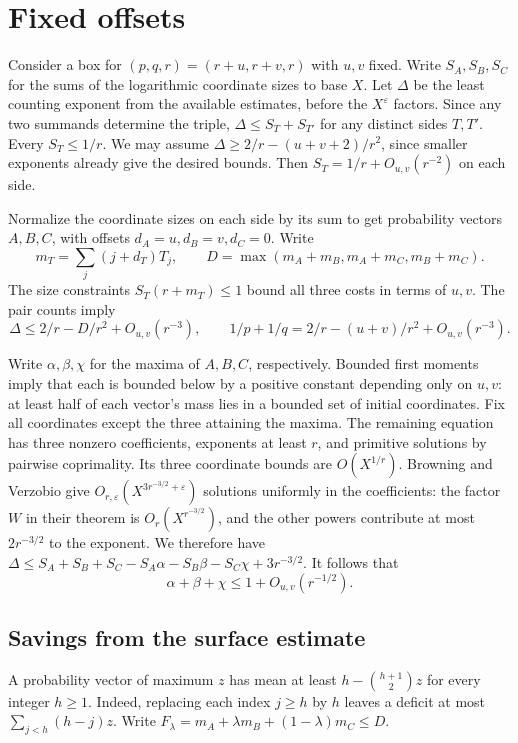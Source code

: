 \documentclass[11pt,reqno]{amsart}
\newcommand{\eps}{\varepsilon}
\begin{document}
\section{Fixed offsets}
Consider a box for \((p,q,r)=(r+u,r+v,r)\) with \(u,v\) fixed.
Write \(S_A,S_B,S_C\) for the sums of the logarithmic coordinate
sizes to base \(X\). Let \(\Delta\) be the least counting exponent
from the available estimates, before the \(X^\eps\) factors.
Since any two summands determine the triple, \(\Delta\le S_T+S_{T'}\)
for any distinct sides \(T,T'\). Every \(S_T\le1/r\).
We may assume \(\Delta\ge2/r-(u+v+2)/r^2\), since smaller
exponents already give the desired bounds. Then
\(S_T=1/r+O_{u,v}(r^{-2})\) on each side.

Normalize the coordinate sizes on each side by its sum to get
probability vectors \(A,B,C\), with offsets \(d_A=u,d_B=v,d_C=0\).
Write
\[
 m_T=\sum_j(j+d_T)T_j,\qquad D=\max(m_A+m_B,m_A+m_C,m_B+m_C).
\]
The size constraints \(S_T(r+m_T)\le1\) bound all three costs
in terms of \(u,v\). The pair counts imply
\begin{equation}\label{eq:consecutive-cost}
 \Delta\le 2/r-D/r^2+O_{u,v}(r^{-3}),\qquad
 1/p+1/q=2/r-(u+v)/r^2+O_{u,v}(r^{-3}).
\end{equation}

Write \(\alpha,\beta,\chi\) for the maxima of \(A,B,C\), respectively.
Bounded first moments imply that each is bounded below by a
positive constant depending only on \(u,v\): at least half of each vector's mass
lies in a bounded set of initial coordinates. Fix all coordinates
except the three attaining the maxima. The remaining equation
has three nonzero coefficients, exponents at least \(r\), and
primitive solutions by pairwise coprimality. Its three coordinate
bounds are \(O(X^{1/r})\). Browning and Verzobio
\cite[Theorem~1.2]{BV} give \(O_{r,\eps}(X^{3r^{-3/2}+\eps})\)
solutions uniformly in the coefficients: the factor \(W\) in their
theorem is \(O_r(X^{r^{-3/2}})\), and the other powers contribute
at most \(2r^{-3/2}\) to the exponent. We therefore have
\(\Delta\le S_A+S_B+S_C-S_A\alpha-S_B\beta-S_C\chi+3r^{-3/2}\).
It follows that
\begin{equation}\label{eq:consecutive-max}
                    \alpha+\beta+\chi\le1+O_{u,v}(r^{-1/2}).
\end{equation}

\subsection{Savings from the surface estimate}
A probability vector of maximum \(z\) has mean at least
\(h-\binom{h+1}{2}z\) for every integer \(h\ge1\).
Indeed, replacing each index \(j\ge h\) by \(h\) leaves a
deficit at most \(\sum_{j<h}(h-j)z\). Write
\(F_\lambda=m_A+\lambda m_B+(1-\lambda)m_C\le D\).
\end{document}
